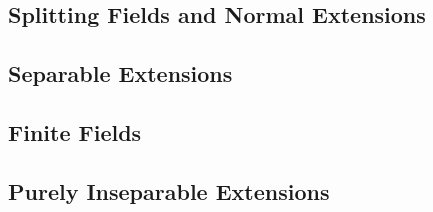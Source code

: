 \subsection{Splitting Fields and Normal Extensions}

\subsection{Separable Extensions}

\subsection{Finite Fields}

\subsection{Purely Inseparable Extensions}